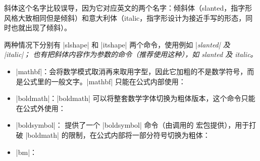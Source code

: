 斜体这个名字比较误导，因为它对应英文的两个名字：倾斜体（slanted，指字形风格大致相同但是倾斜）和意大利体（italic，指字形设计为接近手写的形态，同时也就出现了倾斜）。

两种情况下分别有 |slshape| 和 |itshape| 两个命令，使用例如 |\slshape slanted| 及 |\itshape italic|；
也有把斜体内容作为参数的命令（推荐使用这种），如 \textsl{slanted} 及 \textit{italic}。



\begin{itemize}
  \item |mathbf|：会将数学模式取消再来取用字型，因此它加粗的不是数学符号，而是公式里的一般文字。|mathbf| 只能在公式内部使用： 
  \item |boldmath|：|boldmath| 可以将整套数学字体切换为粗体版本，这个命令只能在公式外使用：
  \item |boldsymbol|： 提供了一个 |boldsymbol| 命令（由调用的  宏包提供），用于打破 |boldmath| 的限制，在公式内部将一部分符号切换为粗体：
  \item |bm|：
\end{itemize}
